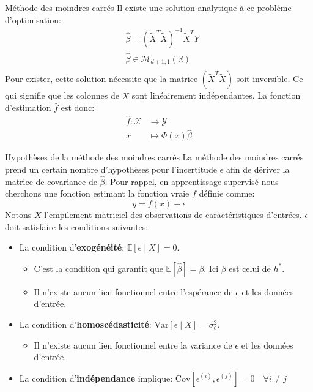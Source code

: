 \documentclass[10pt]{beamer}  %
\begin{document}
\begin{frame}{Méthode des moindres carrés}
	Il existe une solution analytique à ce problème d'optimisation:
	\begin{equation}
		\begin{aligned}
			&\hat{\beta} = \left( \tilde{X}^T \tilde{X}\right)^{-1} \tilde{X}^T Y \\
			&\hat{\beta} \in \mathcal{M}_{d+1, 1}(\mathbb{R}) \\
			\nonumber
		\end{aligned}
	\end{equation}
	Pour exister, cette solution nécessite que la matrice $\left(\tilde{X}^T \tilde{X}\right)$ soit inversible. Ce qui signifie que les colonnes de $\tilde{X}$ sont linéairement indépendantes.
	La fonction d'estimation $\hat{f}$ est donc:
	\begin{equation}
		\begin{aligned}
			\hat{f}: \mathcal{X} &\to \mathcal{Y} \\
			x &\mapsto \Phi(x) \hat{\beta}
			\nonumber
		\end{aligned}
	\end{equation}
\end{frame}

\begin{frame}{Hypothèses de la méthode des moindres carrés}
	La méthode des moindres carrés prend un certain nombre d'hypothèses pour l'incertitude $\epsilon$ afin de dériver la matrice de covariance de $\hat{\beta}$. Pour rappel, en apprentissage supervisé nous cherchons une fonction estimant la fonction vraie $f$ définie comme:
	\begin{equation}
		y = f(x) + \epsilon
		\nonumber
	\end{equation}
	Notons $X$ l'empilement matriciel des observations de caractéristiques d'entrées. $\epsilon$ doit satisfaire les conditions suivantes:
	\begin{itemize}
		\item La condition d'\textbf{exogénéité}: $\mathbb{E}[\epsilon \mid X] = 0$.
		\begin{itemize}
			\item C'est la condition qui garantit que $\mathbb{E}[\hat{\beta}] = \beta$. Ici $\beta$ est celui de $h^*$.
			\item Il n'existe aucun lien fonctionnel entre l'espérance de $\epsilon$ et les données d'entrée.
		\end{itemize}
		\item La condition d'\textbf{homoscédasticité}: $\text{Var}[\epsilon \mid X] = \sigma_{\epsilon}^2$.
		\begin{itemize}
			\item Il n'existe aucun lien fonctionnel entre la variance de $\epsilon$ et les données d'entrée.
		\end{itemize}
		\item La condition d'\textbf{indépendance} implique: $\text{Cov}[\epsilon^{(i)}, \epsilon^{(j)}] =0 \quad \forall i \ne j$
	\end{itemize}
\end{frame}
\end{document}
